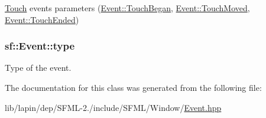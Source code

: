 \hyperlink{classsf_1_1_touch}{Touch} events parameters (\hyperlink{classsf_1_1_event_af41fa9ed45c02449030699f671331d4aafcdbb3d909117eb088c6d290b564e6b5}{Event\-::\-Touch\-Began}, \hyperlink{classsf_1_1_event_af41fa9ed45c02449030699f671331d4aa4eed100fe434d73ac20e6a8cfd1e726c}{Event\-::\-Touch\-Moved}, \hyperlink{classsf_1_1_event_af41fa9ed45c02449030699f671331d4aae35e2e04bb23e95d3786bef60ea4c074}{Event\-::\-Touch\-Ended}) 

\hypertarget{classsf_1_1_event_adf2f8044f713fd9d6019077b0d1ffe0a}{
\subsubsection[{type}]{ sf\-::\-Event\-::type}}\label{classsf_1_1_event_adf2f8044f713fd9d6019077b0d1ffe0a}


Type of the event. 



The documentation for this class was generated from the following file\-:\begin{DoxyCompactItemize}
\item 
lib/lapin/dep/\-S\-F\-M\-L-\/2./include/\-S\-F\-M\-L/\-Window/\hyperlink{lib_2lapin_2dep_2_s_f_m_l-2_83_2include_2_s_f_m_l_2_window_2_event_8hpp}{Event.\-hpp}\end{DoxyCompactItemize}

